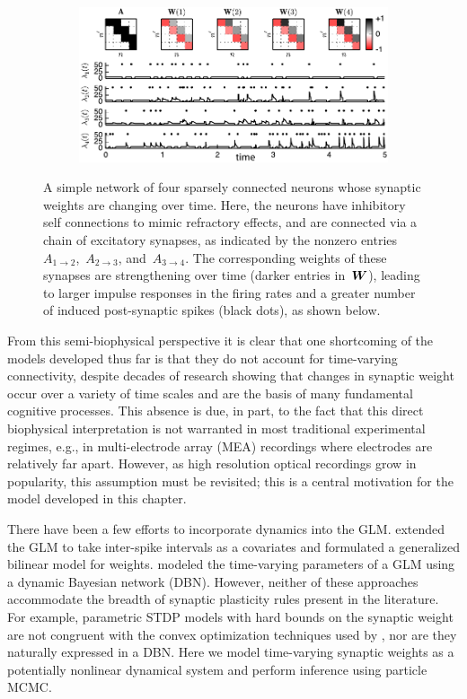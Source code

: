 \begin{figure}[t!]
  \centering
  \begin{subfigure}[T]{5.25in}
    \includegraphics[width=\textwidth]{figures/ch6/figure1}    
  \end{subfigure}
  \caption[A simple example of a GLM with time-varying synaptic weights]{
    A simple network of four sparsely connected neurons whose
    synaptic weights are changing over time. Here, the neurons have
    inhibitory self connections to mimic refractory effects, and are
    connected via a chain of excitatory synapses, as indicated by the
    nonzero entries~$A_{1\to 2}$,~$A_{2 \to 3}$, and~$A_{3\to 4}$. The
    corresponding weights of these synapses are strengthening over time
    (darker entries in~$\boldsymbol{W}$), leading to larger impulse responses in
    the firing rates and a greater number of induced post-synaptic
    spikes (black dots), as shown below.}
  \label{fig:model_illustration}
\end{figure}

From this semi-biophysical perspective it is clear that one
shortcoming of the models developed thus far is that they do not
account for time-varying connectivity, despite decades of research
showing that changes in synaptic weight occur over a variety of time
scales and are the basis of many fundamental cognitive processes. This
absence is due, in part, to the fact that this direct biophysical
interpretation is not warranted in most traditional experimental
regimes, e.g., in multi-electrode array (MEA) recordings where
electrodes are relatively far apart.  However, as high resolution
optical recordings grow in popularity, this assumption must be
revisited; this is a central motivation for the model developed
in this chapter.

There have been a few efforts to incorporate dynamics into the
GLM. \citet{Stevenson-2011} extended the GLM to take inter-spike
intervals as a covariates and formulated a generalized bilinear model
for weights. \citet{Eldawlatly-2010} modeled the time-varying
parameters of a GLM using a dynamic Bayesian network (DBN). However,
neither of these approaches accommodate the breadth of synaptic
plasticity rules present in the literature. For example, parametric
STDP models with hard bounds on the synaptic weight are not congruent
with the convex optimization techniques used by \citep{Stevenson-2011},
nor are they naturally expressed in a DBN. Here we model time-varying
synaptic weights as a potentially nonlinear dynamical system and
perform inference using particle MCMC.

